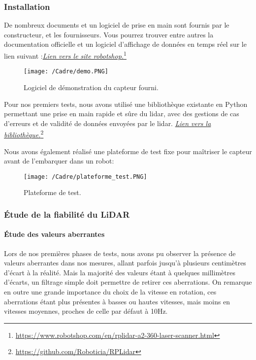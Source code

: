 \subsubsection{Installation}
\tab De nombreux documents et un logiciel de prise en main sont fournis par le constructeur, et les fournisseurs. Vous pourrez trouver entre autres la documentation officielle et un logiciel d’affichage de données en temps réel sur le lien suivant :\newline \href{https://www.robotshop.com/en/rplidar-a2-360-laser-scanner.html}{\textit{Lien vers le site robotshop.}}\footnote{\href{https://www.robotshop.com/en/rplidar-a2-360-laser-scanner.html}{https://www.robotshop.com/en/rplidar-a2-360-laser-scanner.html}}

\begin{figure}[htp]
    \centering
    \texttt{[image: /Cadre/demo.PNG]}
    \caption{Logiciel de démonstration du capteur fourni.}
\end{figure}

Pour nos premiers tests, nous avons utilisé une bibliothèque existante en Python permettant une prise en main rapide et sûre du lidar, avec des gestions de cas d’erreurs et de validité de données envoyées par le lidar.
\href{https://github.com/Roboticia/RPLidar}{\textit{Lien vers la bibliothèque.}}\footnote{\href{https://github.com/Roboticia/RPLidar}{https://github.com/Roboticia/RPLidar}}


Nous avons également réalisé une plateforme de test fixe pour maîtriser le capteur avant de l’embarquer dans un robot:

\begin{figure}[htp]
    \centering
    \texttt{[image: /Cadre/plateforme\_test.PNG]}
    \caption{Plateforme de test.}
\end{figure}

\subsubsection{Étude de la fiabilité du LiDAR}
\paragraph{Étude des valeurs aberrantes}
\tab Lors de nos premières phases de tests, nous avons pu observer la présence de valeurs aberrantes dans nos mesures, allant parfois jusqu'à plusieurs centimètres d'écart à la réalité. Mais la majorité des valeurs étant à quelques millimètres d'écarts, un filtrage simple doit permettre de retirer ces aberrations.
On remarque en outre une grande importance du choix de la vitesse en rotation, ces aberrations étant plus présentes à basses ou hautes vitesses, mais moins en vitesses moyennes, proches de celle par défaut à 10Hz.

